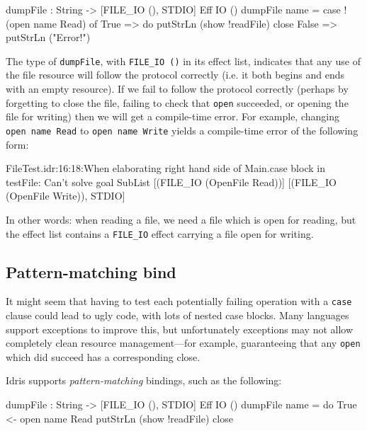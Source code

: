 \begin{code}
dumpFile : String -> { [FILE_IO (), STDIO] } Eff IO ()
dumpFile name = case !(open name Read) of
                    True => do putStrLn (show !readFile)
                               close
                    False => putStrLn ("Error!")
\end{code}

\noindent
The type of \texttt{dumpFile}, with \texttt{FILE\_IO ()} in its effect
list, indicates that any use of the file resource will follow the protocol
correctly (i.e. it both begins and ends with an empty resource). If we fail
to follow the protocol correctly (perhaps by forgetting to close the file,
failing to check that \texttt{open} succeeded, or opening the file for writing)
then we will get a compile-time error. For example, changing \texttt{open name Read}
to \texttt{open name Write} yields a compile-time error of the following
form:

\begin{code}
FileTest.idr:16:18:When elaborating right hand side of Main.case 
block in testFile:
Can't solve goal 
        SubList [(FILE_IO (OpenFile Read))]
                [(FILE_IO (OpenFile Write)), STDIO]
\end{code}

\noindent
In other words: when reading a file, we need a file which is open for reading,
but the effect list contains a \texttt{FILE\_IO} effect carrying a file open
for writing.

\subsection{Pattern-matching bind}

It might seem that having to test each potentially failing operation with
a \texttt{case} clause could lead to ugly code, with lots of nested case
blocks. Many languages support exceptions to improve this, but unfortunately
exceptions may not allow completely clean resource management---for example,
guaranteeing that any \texttt{open} which did succeed has a corresponding close.

Idris supports \emph{pattern-matching} bindings, such as the following:

\begin{code}
dumpFile : String -> { [FILE_IO (), STDIO] } Eff IO ()
dumpFile name = do True <- open name Read 
                   putStrLn (show !readFile)
                   close
\end{code}

